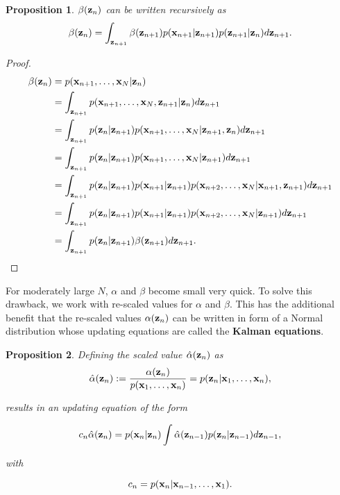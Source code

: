 \documentclass[11pt]{article}
\numberwithin{equation}{section}
\newcommand{\x}{{\bf x}}
\newcommand{\z}{{\bf z}}
\newtheorem{proposition}{Proposition}[section]
\begin{document}
\begin{proposition} \label{prop:beta-recursive}
	$\beta(\z_n)$ can be written recursively as
	\begin{equation}
		\beta(\z_n) = \int_{\z_{n+1}} \beta(\z_{n+1})p(\x_{n+1}\vert \z_{n+1}) p(\z_{n+1}\vert \z_n) d\z_{n+1}.
	\end{equation} 
\end{proposition}

\begin{proof}
	\begin{align}
		\beta(\z_n) &= p(\x_{n+1}, \ldots, \x_N \vert \z_n)\\
		&= \int_{\z_{n+1}} p(\x_{n+1}, \ldots, \x_N, \z_{n+1} \vert \z_n) d\z_{n+1} \\
		&= \int_{\z_{n+1}} p(\z_n \vert \z_{n+1}) p(\x_{n+1}, \ldots, \x_N \vert \z_{n+1}, \z_n) d\z_{n+1} \\
		&= \int_{\z_{n+1}} p(\z_n \vert \z_{n+1}) p(\x_{n+1}, \ldots, \x_N \vert \z_{n+1}) d\z_{n+1} \\
		&= \int_{\z_{n+1}} p(\z_n \vert \z_{n+1}) p(\x_{n+1} \vert \z_{n+1}) p(\x_{n+2}, \ldots, \x_N \vert \x_{n+1}, \z_{n+1}) d\z_{n+1} \\
		&= \int_{\z_{n+1}} p(\z_n \vert \z_{n+1}) p(\x_{n+1} \vert \z_{n+1}) p(\x_{n+2}, \ldots, \x_N \vert \z_{n+1}) d\z_{n+1}\\
		&= \int_{\z_{n+1}} p(\z_n \vert \z_{n+1}) \beta(\z_{n+1}) d\z_{n+1}.
	\end{align}
\end{proof}

For moderately large $N$, $\alpha$ and $\beta$ become small very quick. To solve this drawback, we work with re-scaled values for $\alpha$ and $\beta$. This has the additional benefit that the re-scaled values $\alpha(\z_n)$ can be written in form of a Normal distribution whose updating equations are  called the \textbf{Kalman equations}.


\begin{proposition} \label{prop:alpha-hat}
	Defining the scaled value $\hat\alpha(\z_n)$ as
	\begin{equation}
		\hat\alpha(\z_n) := \frac{\alpha(\z_n)}{p(\x_1, \ldots, \x_n)} = p(\z_n \vert \x_1, \ldots, \x_n),
	\end{equation}
	
	results in an updating equation of the form
	
	\begin{equation}
		 c_n \hat\alpha(\z_n) = p(\x_n\vert\z_n)\int \hat\alpha(\z_{n-1})p(\z_n \vert \z_{n-1}) d\z_{n-1},
	\end{equation}
	
	with
	
	\begin{equation}
		c_n = p(\x_n \vert \x_{n-1}, \ldots, \x_1).
	\end{equation}
\end{proposition}
\end{document}
